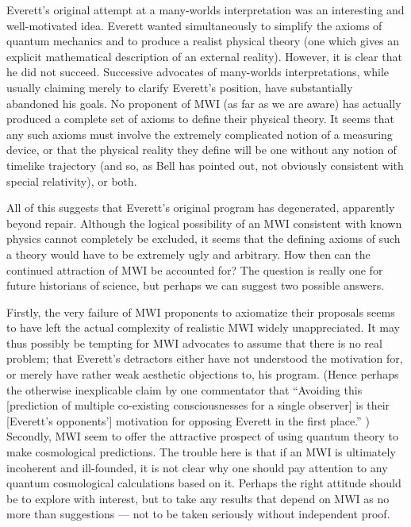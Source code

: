 \documentclass[aps,pra,12pt]{revtex4}
\begin{document}
Everett's original attempt at a many-worlds interpretation was an
interesting and well-motivated idea. 
Everett wanted simultaneously to simplify the axioms of quantum
mechanics and to produce a realist physical theory (one which 
gives an explicit mathematical description of an external reality). 
However, it is clear that he did not succeed. 
Successive advocates of many-worlds interpretations, while usually 
claiming merely to clarify Everett's position, have substantially abandoned 
his goals.  
No proponent of MWI (as far as we are aware)
has actually produced a complete set of axioms to
define their physical theory.  
It seems that any such axioms must involve the extremely complicated notion
of a measuring device, or that the physical reality they define will 
be one without any notion of timelike trajectory (and so, as 
Bell \cite{bell1,bell2} 
has pointed out, not obviously consistent with special relativity), or both. 

All of this suggests that Everett's original program has degenerated,  
apparently beyond repair.  
Although the logical possibility of an MWI consistent with known physics
cannot completely be excluded, it seems that the defining axioms
of such a theory would have to be extremely ugly and arbitrary.
How then can the continued attraction of MWI be accounted for?  
The question is really one for future historians of science,
but perhaps we can suggest two possible answers.

Firstly, the very failure of MWI proponents to axiomatize their
proposals seems to have left the actual complexity of realistic MWI widely
unappreciated.  
It may thus possibly be tempting for MWI advocates
to assume that there is no real problem;
that Everett's detractors
either have not understood the motivation for, or merely have rather
weak aesthetic objections to, his program.  (Hence perhaps the
otherwise inexplicable claim by one commentator that ``Avoiding this
[prediction of multiple co-existing consciousnesses for a single
observer] is their [Everett's opponents'] motivation for opposing
Everett in the first place.'' \cite{deutsch})
Secondly, MWI seem to offer the attractive prospect of using quantum
theory to make cosmological predictions.  
The trouble here is that if an MWI is ultimately incoherent and ill-founded,
it is not clear why one should pay attention to
any quantum cosmological calculations based on it.
Perhaps the right attitude
should be to explore with interest, but to take any results that 
depend on MWI as no more than suggestions --- not to be taken seriously
without independent proof. 
\end{document}
